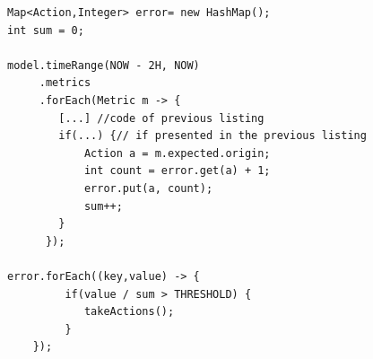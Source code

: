 \begin{figure}[ht!]
\begin{lstlisting}[style=customc,caption=Extraction of expected and measured value of a metric with a delta time,label=code:meta-supervision,basicstyle=\scriptsize]
Map<Action,Integer> error= new HashMap();
int sum = 0;

model.timeRange(NOW - 2H, NOW)
     .metrics
     .forEach(Metric m -> {
        [...] //code of previous listing
        if(...) {// if presented in the previous listing
            Action a = m.expected.origin;
            int count = error.get(a) + 1; 
            error.put(a, count);
            sum++;
        }
      });

error.forEach((key,value) -> {
         if(value / sum > THRESHOLD) {
            takeActions();
         }
    });
\end{lstlisting}	
\end{figure}
